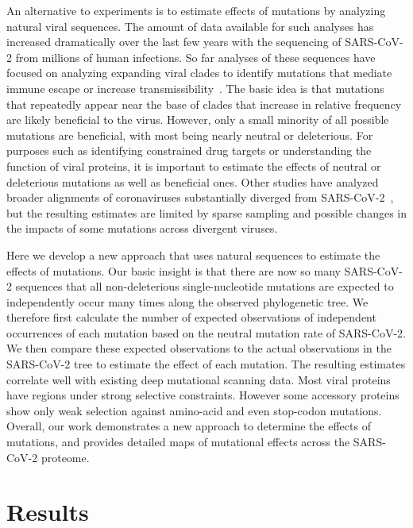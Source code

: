 \documentclass[9pt,twocolumn,twoside]{gsajnl_modified}
\begin{document}
An alternative to experiments is to estimate effects of mutations by analyzing natural viral sequences.
The amount of data available for such analyses has increased dramatically over the last few years with the sequencing of SARS-CoV-2 from millions of human infections.
So far analyses of these sequences have focused on analyzing expanding viral clades to identify mutations that mediate immune escape or increase transmissibility~\citep{obermeyer2022analysis,lee2022inferring,maher2022predicting}.
The basic idea is that mutations that repeatedly appear near the base of clades that increase in relative frequency are likely beneficial to the virus.
However, only a small minority of all possible mutations are beneficial, with most being nearly neutral or deleterious.
For purposes such as identifying constrained drug targets or understanding the function of viral proteins, it is important to estimate the effects of neutral or deleterious mutations as well as beneficial ones.
Other studies have analyzed broader alignments of coronaviruses substantially diverged from SARS-CoV-2~\citep{rodriguez2022epistatic, thadani2022learning}, but the resulting estimates are limited by sparse sampling and possible changes in the impacts of some mutations across divergent viruses.

Here we develop a new approach that uses natural sequences to estimate the effects of mutations.
Our basic insight is that there are now so many SARS-CoV-2 sequences that all non-deleterious single-nucleotide mutations are expected to independently occur many times along the observed phylogenetic tree.
We therefore first calculate the number of expected observations of independent occurrences of each mutation based on the neutral mutation rate of SARS-CoV-2.
We then compare these expected observations to the actual observations in the SARS-CoV-2 tree to estimate the effect of each mutation.
The resulting estimates correlate well with existing deep mutational scanning data.
Most viral proteins have regions under strong selective constraints.
However some accessory proteins show only weak selection against amino-acid and even stop-codon mutations.
Overall, our work demonstrates a new approach to determine the effects of mutations, and provides detailed maps of mutational effects across the SARS-CoV-2 proteome.

\section{Results}
\end{document}

